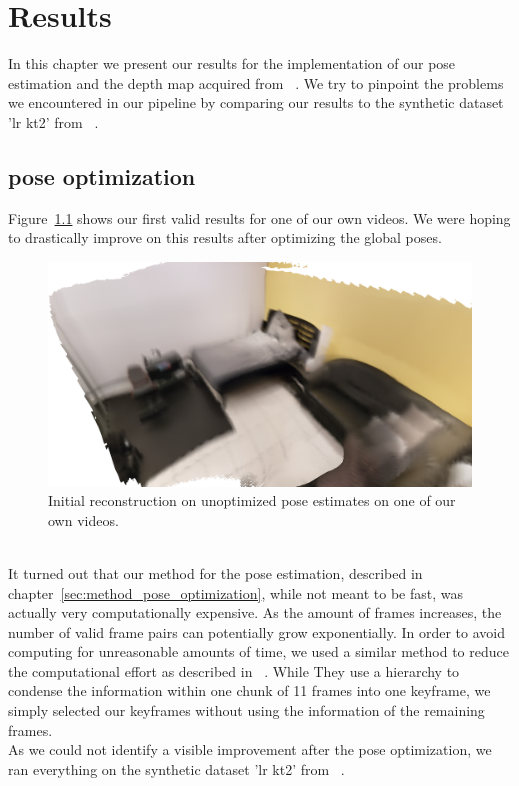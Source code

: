 \chapter{Results}\label{seq:results}
    In this chapter we present our results for the implementation of our pose estimation and the depth map acquired from ~\cite{luo2020consistent}.
    We try to pinpoint the problems we encountered in our pipeline by comparing our results to the synthetic dataset 'lr kt2' from ~\cite{handa:etal:ICRA2014}.
    \section{pose optimization}
        Figure~\ref{fig:initial_reconstruction} shows our first valid results for one of our own videos.
        We were hoping to drastically improve on this results after optimizing the global poses.
        \begin{figure}[ht]
            \centering
            \includegraphics[width=.6\textwidth]{images/initial_reconstruction.png}
            \caption{Initial reconstruction on unoptimized pose estimates on one of our own videos.}
            \label{fig:initial_reconstruction}
        \end{figure}\\
        It turned out that our method for the pose estimation, described in chapter~\ref{sec:method_pose_optimization}, while not meant to be fast, was actually very computationally expensive.
        As the amount of frames increases, the number of valid frame pairs can potentially grow exponentially.
        In order to avoid computing for unreasonable amounts of time, we used a similar method to reduce the computational effort as described in ~\cite{dai2017bundlefusion}.
        While They use a hierarchy to condense the information within one chunk of 11 frames into one keyframe, we simply selected our keyframes without using the information of the remaining frames.\\
        As we could not identify a visible improvement after the pose optimization, we ran everything on the synthetic dataset 'lr kt2' from ~\cite{handa:etal:ICRA2014}.
